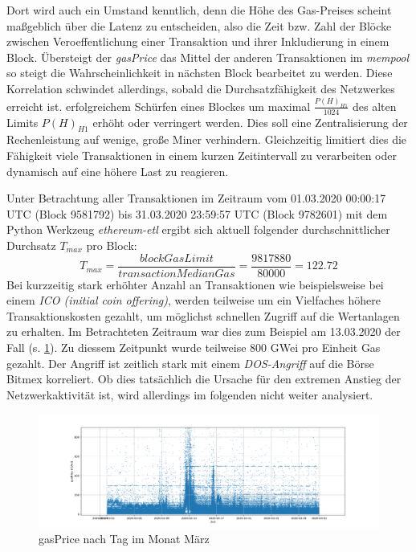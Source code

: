 \documentclass[runningheads]{llncs}
\begin{document}
Dort wird auch ein Umstand kenntlich, denn die Höhe des Gas-Preises scheint maßgeblich über die Latenz zu entscheiden, also die Zeit bzw. Zahl der Blöcke zwischen Veroeffentlichung einer Transaktion und ihrer Inkludierung in einem Block. Übersteigt der \textit{gasPrice} das Mittel der anderen Transaktionen im \textit{mempool} so steigt die Wahrscheinlichkeit in nächsten Block bearbeitet zu werden. Diese Korrelation schwindet allerdings, sobald die Durchsatzfähigkeit des Netzwerkes erreicht ist. \cite[S. 30 f.]{pierro_influence_2019} erfolgreichem Schürfen eines Blockes um maximal $ \frac{P(H)_{H1}}{1024} $ des alten Limits  $ P(H)_{H1} $ erhöht oder verringert werden. Dies soll eine Zentralisierung der Rechenleistung auf wenige, große Miner verhindern. Gleichzeitig limitiert dies die Fähigkeit viele Transaktionen in einem kurzen Zeitintervall zu verarbeiten oder dynamisch auf eine höhere Last zu reagieren.

Unter Betrachtung aller Transaktionen im Zeitraum vom 01.03.2020 00:00:17 UTC (Block 9581792) bis 31.03.2020 23:59:57 UTC (Block 9782601) mit dem Python Werkzeug \textit{ethereum-etl} \cite{noauthor_blockchain-etl/ethereum-etl_2020} ergibt sich aktuell folgender durchschnittlicher Durchsatz $ T_{max} $ pro Block: \cite{neemann_appendix_nodate}
$$
  T_{max} = \frac{\textit{blockGasLimit}}{\textit{transactionMedianGas}} = \frac{9817880}{80000} = 122.72
$$
Bei kurzzeitig stark erhöhter Anzahl an Transaktionen wie beispielsweise bei einem \textit{ICO (initial coin offering)}, werden teilweise um ein Vielfaches höhere Transaktionskosten gezahlt, um möglichst schnellen Zugriff auf die Wertanlagen zu erhalten. \cite[S. 9:6 f.]{m.spain_oasics-tokeneconomics_2019} Im Betrachteten Zeitraum war dies zum Beispiel am 13.03.2020 der Fall (s. \ref{transactions_gasprice_timeseries}). Zu diessem Zeitpunkt wurde teilweise 800 GWei pro Einheit Gas gezahlt. Der Angriff ist zeitlich stark mit einem \textit{DOS-Angriff} auf die Börse Bitmex korreliert. Ob dies tatsächlich die Ursache für den extremen Anstieg der Netzwerkaktivität ist, wird allerdings im folgenden nicht weiter analysiert. \cite{bitmex_ddos_nodate}

\begin{figure}[h!]
  \centerline{\includegraphics[width=18cm, keepaspectratio]{transactions_gasprice_timeseries.png}}
  \caption{gasPrice nach Tag im Monat März \cite{neemann_appendix_nodate}}
  \label{transactions_gasprice_timeseries}
\end{figure}
\end{document}
